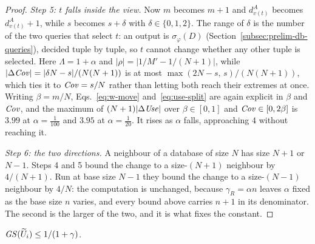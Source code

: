 \begin{proof}
{\emph{Step 5: $t$ falls inside the view.}
Now $m$ becomes $m+1$ and $d^A_{v(t)}$ becomes $d^A_{v(t)}+1$, while $s$ becomes $s+\delta$ with
$\delta\in\{0,1,2\}$.
The range of $\delta$ is the number of the two queries that select $t$: an output is
$\sigma_\varphi(D)$ (Section~\ref{subsec:prelim-db-queries}), decided tuple by tuple, so $t$
cannot change whether any other tuple is selected.
Here $\Lambda=1+\alpha$ and $|\rho|=|1/M'-1/(N+1)|$, while $|\Delta\mathit{Cov}|=|\delta N-s|/(N(N+1))$
is at most $\max(2N-s,\,s)/(N(N+1))$, which ties it to $\mathit{Cov}=s/N$ rather than letting both reach
their extremes at once.
Writing $\beta=m/N$, Eqs.~\eqref{eq:w-move} and~\eqref{eq:use-split} are again explicit in
$\beta$ and $\mathit{Cov}$, and the maximum of $(N+1)|\Delta\mathit{Use}|$ over $\beta\in[0,1]$ and
$\mathit{Cov}\in[0,2\beta]$ is $3.99$ at
$\alpha=\tfrac1{100}$ and $3.95$ at $\alpha=\tfrac1{20}$.
It rises as $\alpha$ falls, approaching $4$ without reaching it.

\emph{Step 6: the two directions.}
A neighbour of a database of size $N$ has size $N+1$ or $N-1$.
Steps 4 and 5 bound the change to a size-$(N+1)$ neighbour by $4/(N+1)$.
Run at base size $N-1$ they bound the change to a size-$(N-1)$ neighbour by $4/N$: the
computation is unchanged, because $\gamma_R=\alpha n$ leaves $\alpha$ fixed as the base size $n$
varies, and every bound above carries $n+1$ in its denominator.
The second is the larger of the two, and it is what fixes the constant.}
\end{proof}


\begin{proposition}
\label{prop:selection-utility-sensitivity}
$\mathit{GS}(\widetilde{U}_i)\le 1/(1+\gamma)$.
\end{proposition}

